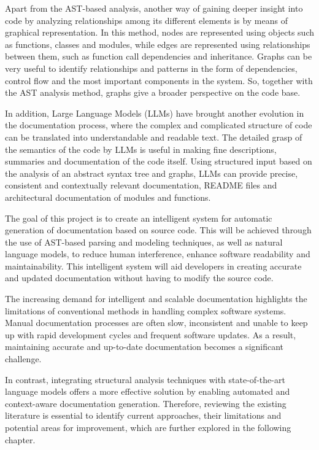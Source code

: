 \par Apart from the AST-based analysis, another way of gaining deeper insight into code by analyzing relationships among its different elements is by means of graphical representation. In this method, nodes are represented using objects such as functions, classes and modules, while edges are represented using relationships between them, such as function call dependencies and inheritance. Graphs can be very useful to identify relationships and patterns in the form of dependencies, control flow and the most important components in the system. So, together with the AST analysis method, graphs give a broader perspective on the code base. 

\par In addition, Large Language Models (LLMs) have brought another evolution in the documentation process, where the complex and complicated structure of code can be translated into understandable and readable text. The detailed grasp of the semantics of the code by LLMs is useful in making fine descriptions, summaries and documentation of the code itself. Using structured input based on the analysis of an abstract syntax tree and graphs, LLMs can provide precise, consistent and contextually relevant documentation, README files and architectural documentation of modules and functions.

\par The goal of this project is to create an intelligent system for automatic generation of documentation based on source code. This will be achieved through the use of AST-based parsing and modeling techniques, as well as natural language models, to reduce human interference, enhance software readability and maintainability. This intelligent system will aid developers in creating accurate and updated documentation without having to modify the source code.

\par The increasing demand for intelligent and scalable documentation highlights the limitations of conventional methods in handling complex software systems. Manual documentation processes are often slow, inconsistent and unable to keep up with rapid development cycles and frequent software updates. As a result, maintaining accurate and up-to-date documentation becomes a significant challenge.

\par In contrast, integrating structural analysis techniques with state-of-the-art language models offers a more effective solution by enabling automated and context-aware documentation generation. Therefore, reviewing the existing literature is essential to identify current approaches, their limitations and potential areas for improvement, which are further explored in the following chapter.